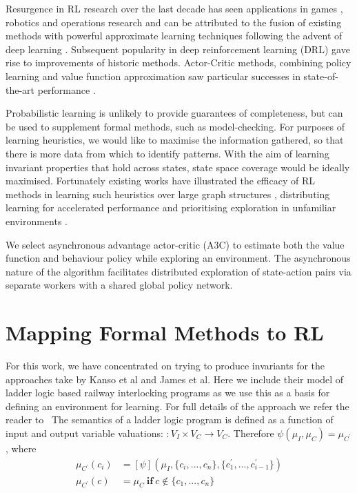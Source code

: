 \documentclass[runningheads]{llncs}
\begin{document}
Resurgence in RL research over the last decade has seen applications in games \cite{schaul2015prioritized, silver2016mastering, vinyals2019grandmaster}, robotics \cite{gu2017deep, bloesch2022towards} and operations research \cite{mazyavkina2021reinforcement} and can be attributed to the fusion of existing methods \cite{watkins1992q} with powerful approximate learning techniques \cite{lecun2015deep} following the advent of deep learning \cite{mnih2013playing}. Subsequent popularity in deep reinforcement learning (DRL) gave rise to improvements of historic methods\cite{schulman2017trust}. Actor-Critic methods, combining policy learning \cite{kakade2001natural} and value function approximation saw particular successes in state-of-the-art performance \cite{schulman2017proximal}.

Probabilistic learning is unlikely to provide guarantees of completeness, but can be used to supplement formal methods, such as model-checking. For purposes of learning heuristics, we would like to maximise the information gathered, so that there is more data from which to identify patterns. With the aim of learning invariant properties that hold across states, state space coverage would be ideally maximised. Fortunately existing works have illustrated the efficacy of RL methods in learning such heuristics over large graph structures \cite{manchanda2019learning}, distributing learning for accelerated performance \cite{hoffman2020acme} and prioritising exploration in unfamiliar environments \cite{ostrovski2017countbased, haarnoja2018soft, gordillo2021improving}.

We select asynchronous advantage actor-critic (A3C) to estimate both the value function and behaviour policy while exploring an environment. The asynchronous nature of the algorithm facilitates distributed exploration of state-action pairs via separate workers with a shared global policy network.


\section{Mapping Formal Methods to RL} \label{sec:mapping_fm_to_ml}
For this work, we have concentrated on trying to produce invariants for the approaches take by Kanso et al\cite{} and James et al\cite{}. Here we include their model of ladder logic based railway interlocking programs as we use this as a basis for defining an environment for learning. For full details of the approach we refer the reader to\cite{}
\
The semantics of a ladder logic program is defined as a function of input and output variable valuations:
\begin{math}
	[\psi] : V_I \times V_C \to V_C
\end{math}. Therefore $\psi(\mu_I, \mu_C) = \mu_{C^\prime}$, where
\begin{align}
	\mu_{C^\prime}(c_i) & = [\psi](\mu_I, \{c_i,...,c_n\}, \{c^\prime_1,...,c^\prime_{i-1}\}) \\
	\mu_{C^\prime}(c) & = \mu_C \ \mathbf{if} \ c \notin \{c_1,...,c_n\} 
\end{align} 
\end{document}
